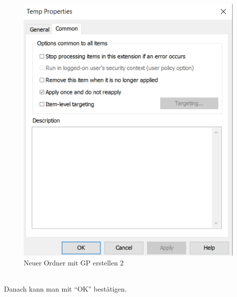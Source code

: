 \begin{minipage}{0.5\linewidth}
    \begin{figure}[H]
        \centering
        \includegraphics[width=\linewidth]{../img/sysmon/new-folder-2.png}
        \caption{Neuer Ordner mit GP erstellen 2}
    \end{figure}
\end{minipage}\\

Danach kann man mit ``OK'' bestätigen.\\


